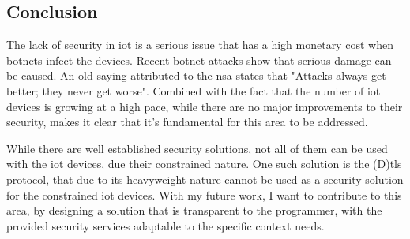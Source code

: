 \documentclass{llncs}
\begin{document}
\subsection{Conclusion}

The lack of security in \gls{iot} is a serious issue that has a high monetary cost
when botnets infect the devices. Recent
botnet attacks show that serious damage can be caused. An old saying attributed to the
\gls{nsa} states that "Attacks always get better; they never get worse".
Combined with the fact that the number of \gls{iot} devices is growing at a high
pace, while there are no major improvements to their security, makes it clear
that it's fundamental for this area to be addressed.

While there are well established security solutions, not all of them can be used
with the \gls{iot} devices, due their constrained nature. One such solution is
the (D)\gls{tls} protocol, that due to its heavyweight nature cannot be used
as a security solution for the constrained \gls{iot} devices. With my future work,
I want to contribute to this area, by designing a solution that is transparent
to the programmer, with the provided security services adaptable to the specific context needs.

%
\nocite{*}


%
\printglossary[style=long]
%
\end{document}
